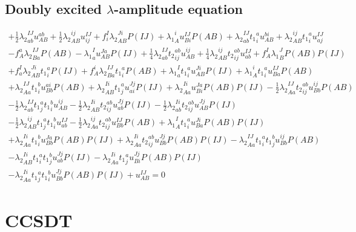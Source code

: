 \subsection{Doubly excited $\lambda$-amplitude equation}

\begin{gather*}
+ \frac{1}{2}{\lambda_2}^{IJ}_{ab} u^{ab}_{AB}
+ \frac{1}{2}{\lambda_2}^{ij}_{AB} u^{IJ}_{ij}
+ f^{I}_{i} {\lambda_2}^{Ji}_{AB} P(IJ)
+ {\lambda_1}^{i}_{A} u^{IJ}_{Bi} P(AB)
+ {\lambda_2}^{IJ}_{ab} {t_1}^{a}_{i} u^{bi}_{AB}
+ {\lambda_2}^{ij}_{AB} {t_1}^{a}_{i} u^{IJ}_{aj} \\
- f^{a}_{A} {\lambda_2}^{IJ}_{Ba} P(AB)
- {\lambda_1}^{I}_{a} u^{Ja}_{AB} P(IJ)
+ \frac{1}{4}{\lambda_2}^{IJ}_{ab} {t_2}^{ab}_{ij} u^{ij}_{AB}
+ \frac{1}{4}{\lambda_2}^{ij}_{AB} {t_2}^{ab}_{ij} u^{IJ}_{ab}
+ f^{I}_{A} {\lambda_1}^{J}_{B} P(AB) P(IJ) \\
+ f^{I}_{a} {\lambda_2}^{Ji}_{AB} {t_1}^{a}_{i} P(IJ)
+ f^{i}_{A} {\lambda_2}^{IJ}_{Ba} {t_1}^{a}_{i} P(AB)
+ {\lambda_1}^{I}_{a}   {t_1}^{a}_{i} u^{Ji}_{AB} P(IJ)
+ {\lambda_1}^{i}_{A}   {t_1}^{a}_{i} u^{IJ}_{Ba} P(AB) \\
+ {\lambda_2}^{IJ}_{Aa} {t_1}^{b}_{i} u^{ai}_{Bb} P(AB)
+ {\lambda_2}^{Ii}_{AB} {t_1}^{a}_{j} u^{Jj}_{ai} P(IJ)
+ {\lambda_2}^{Ii}_{Aa} u^{Ja}_{Bi} P(AB) P(IJ)
- \frac{1}{2}{\lambda_2}^{IJ}_{Aa} {t_2}^{ab}_{ij} u^{ij}_{Bb} P(AB) \\
- \frac{1}{2}{\lambda_2}^{IJ}_{ab} {t_1}^{a}_{j} {t_1}^{b}_{i} u^{ij}_{AB}
- \frac{1}{2}{\lambda_2}^{Ii}_{AB} {t_2}^{ab}_{ij} u^{Jj}_{ab} P(IJ)
- \frac{1}{2}{\lambda_2}^{Ii}_{ab} {t_2}^{ab}_{ij} u^{Jj}_{AB} P(IJ) \\
- \frac{1}{2}{\lambda_2}^{ij}_{AB} {t_1}^{a}_{j} {t_1}^{b}_{i} u^{IJ}_{ab}
- \frac{1}{2}{\lambda_2}^{ij}_{Aa} {t_2}^{ab}_{ij} u^{IJ}_{Bb} P(AB)
+ {\lambda_1}^{I}_{A}   {t_1}^{a}_{i} u^{Ji}_{Ba} P(AB) P(IJ) \\
+ {\lambda_2}^{Ii}_{Aa} {t_1}^{b}_{i} u^{Ja}_{Bb} P(AB) P(IJ)
+ {\lambda_2}^{Ii}_{Aa} {t_2}^{ab}_{ij} u^{Jj}_{Bb} P(AB) P(IJ)
- {\lambda_2}^{IJ}_{Aa} {t_1}^{a}_{i} {t_1}^{b}_{j} u^{ij}_{Bb} P(AB) \\
- {\lambda_2}^{Ii}_{AB} {t_1}^{a}_{i} {t_1}^{b}_{j} u^{Jj}_{ab} P(IJ)
- {\lambda_2}^{Ii}_{Aa} {t_1}^{a}_{j} u^{Jj}_{Bi} P(AB) P(IJ) \\
- {\lambda_2}^{Ii}_{Aa} {t_1}^{a}_{j} {t_1}^{b}_{i} u^{Jj}_{Bb} P(AB) P(IJ)
+ u^{IJ}_{AB} = 0
\end{gather*}

\section{CCSDT}

